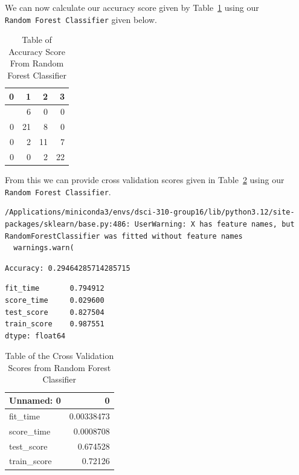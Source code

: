 \documentclass[
  letterpaper,
  DIV=11,
  numbers=noendperiod]{scrartcl}
\begin{document}
We can now calculate our accuracy score given by
Table~\ref{tbl-accuracy-score} using our
\texttt{Random\ Forest\ Classifier} given below.

\begin{longtable}[]{@{}rrrr@{}}

\caption{\label{tbl-accuracy-score}Table of Accuracy Score From Random
Forest Classifier}

\tabularnewline

\toprule\noalign{}
0 & 1 & 2 & 3 \\
\midrule\noalign{}
\endhead
\bottomrule\noalign{}
\endlastfoot
0 & 6 & 0 & 0 \\
0 & 21 & 8 & 0 \\
0 & 2 & 11 & 7 \\
0 & 0 & 2 & 22 \\

\end{longtable}

From this we can provide cross validation scores given in
Table~\ref{tbl-rfc-cross-validate} using our
\texttt{Random\ Forest\ Classifier}.

\begin{verbatim}
/Applications/miniconda3/envs/dsci-310-group16/lib/python3.12/site-packages/sklearn/base.py:486: UserWarning: X has feature names, but RandomForestClassifier was fitted without feature names
  warnings.warn(
\end{verbatim}

\begin{verbatim}
Accuracy: 0.29464285714285715
\end{verbatim}

\begin{verbatim}
fit_time       0.794912
score_time     0.029600
test_score     0.827504
train_score    0.987551
dtype: float64
\end{verbatim}

\begin{longtable}[]{@{}lr@{}}

\caption{\label{tbl-rfc-cross-validate}Table of the Cross Validation
Scores from Random Forest Classifier}

\tabularnewline

\toprule\noalign{}
Unnamed: 0 & 0 \\
\midrule\noalign{}
\endhead
\bottomrule\noalign{}
\endlastfoot
fit\_time & 0.00338473 \\
score\_time & 0.0008708 \\
test\_score & 0.674528 \\
train\_score & 0.72126 \\

\end{longtable}
\end{document}
